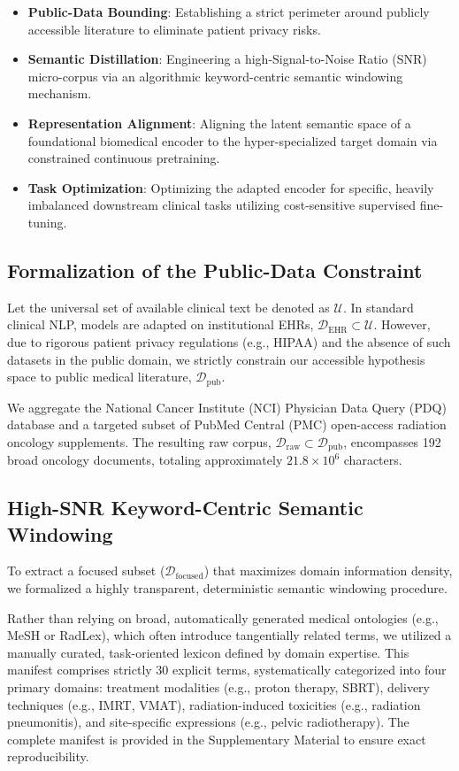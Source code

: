 \documentclass[a4paper,fleqn]{cas-dc}
\begin{document}
\begin{itemize}
	\item \textbf{Public-Data Bounding}: Establishing a strict perimeter around publicly accessible literature to eliminate patient privacy risks.
	\item \textbf{Semantic Distillation}: Engineering a high-Signal-to-Noise Ratio (SNR) micro-corpus via an algorithmic keyword-centric semantic windowing mechanism.
	\item \textbf{Representation Alignment}: Aligning the latent semantic space of a foundational biomedical encoder to the hyper-specialized target domain via constrained continuous pretraining.
	\item \textbf{Task Optimization}: Optimizing the adapted encoder for specific, heavily imbalanced downstream clinical tasks utilizing cost-sensitive supervised fine-tuning.
\end{itemize}

\subsection{Formalization of the Public-Data Constraint}
Let the universal set of available clinical text be denoted as $\mathcal{U}$. In standard clinical NLP, models are adapted on institutional EHRs, $\mathcal{D}_{\text{EHR}} \subset \mathcal{U}$. However, due to rigorous patient privacy regulations (e.g., HIPAA) and the absence of such datasets in the public domain, we strictly constrain our accessible hypothesis space to public medical literature, $\mathcal{D}_{\text{pub}}$.

We aggregate the National Cancer Institute (NCI) Physician Data Query (PDQ) database and a targeted subset of PubMed Central (PMC) open-access radiation oncology supplements. The resulting raw corpus, $\mathcal{D}_{\text{raw}} \subset \mathcal{D}_{\text{pub}}$, encompasses 192 broad oncology documents, totaling approximately $21.8 \times 10^6$ characters.

\subsection{High-SNR Keyword-Centric Semantic Windowing}
To extract a focused subset ($\mathcal{D}_{\text{focused}}$) that maximizes domain information density, we formalized a highly transparent, deterministic semantic windowing procedure.

Rather than relying on broad, automatically generated medical ontologies (e.g., MeSH or RadLex), which often introduce tangentially related terms, we utilized a manually curated, task-oriented lexicon defined by domain expertise. This manifest comprises strictly 30 explicit terms, systematically categorized into four primary domains: treatment modalities (e.g., proton therapy, SBRT), delivery techniques (e.g., IMRT, VMAT), radiation-induced toxicities (e.g., radiation pneumonitis), and site-specific expressions (e.g., pelvic radiotherapy). The complete manifest is provided in the Supplementary Material to ensure exact reproducibility.
\end{document}

